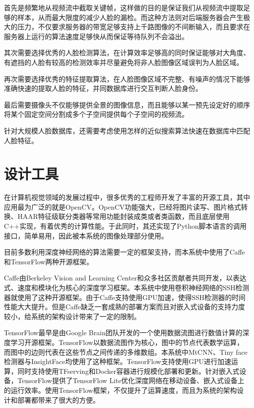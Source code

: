 首先是频繁地从视频流中截取关键帧，这样做的目的是保证我们从视频流中提取足够的样本，从而最大限度的减少人脸的漏检。而这种方法则对后端服务器会产生极大的压力，不仅要求服务器的带宽足够支持上千路图像的不间断输入，而且要求在服务器上运行的算法速度足够快从而保证等待队列不会溢出。

其次需要选择优秀的人脸检测算法，在计算效率足够高的同时保证能够对大角度、有遮挡的人脸有较高的检测效率并尽量避免将非人脸图像区域误判为人脸区域。

再次需要选择优秀的特征提取算法，在人脸图像区域不完整、有噪声的情况下能够准确快速的提取人脸的特征，并同数据库进行交互判断人脸身份。

最后需要摄像头不仅能够提供全景的图像信息，而且能够以某一预先设定好的顺序将某个固定空间分割成多个子空间提供每个子空间的视频流。

针对大规模人脸数据库，还需要考虑使用怎样的近似搜索算法快速在数据库中匹配人脸特征。

\section{设计工具}

在计算机视觉领域的发展过程中，很多优秀的工程师开发了丰富的开源工具，其中应用最为广泛的就是OpenCV\cite{opencv_library}。OpenCV功能强大，已经将图片读写、图片格式转换、HAAR特征级联分类器等常用功能封装成类或者类函数，而且底层使用C++实现，有着优秀的计算性能。于此同时，其还实现了Python脚本语言的调用接口，简单易用，因此被本系统的图像处理部分使用。

目前多数利用深度神经网络的算法需要一定的框架支持，而本系统中使用了Caffe\cite{jia2014caffe}和TensorFlow\cite{tensorflow2015-whitepaper}两种开源框架。

Caffe由Berkeley Vision and Learning Center和众多社区贡献者共同开发，以表达式、速度和模块化为核心的深度学习框架。本系统中使用卷积神经网络的SSH检测器就使用了这种开源框架。由于Caffe支持使用GPU加速，使得SSH检测器的时间性能大大提升。但是Caffe缺乏一套成熟的部署方案而且对嵌入式设备的支持力度较小，给系统的架构设计带来了一定的限制。

TensorFlow最早是由Google Brain团队开发的一个使用数据流图进行数值计算的深度学习开源框架。TensorFlow以数据流图作为核心，图中的节点代表数学运算，而图中的边则代表在这些节点之间传递的多维数组。本系统中MtCNN\cite{zhang2016joint}、Tiny face检测器\cite{hu2017finding}与InsightFace\cite{deng2018arcface}均使用了这种框架。TensorFlow支持使用GPU进行加速运算，同时支持使用TFserving和Docker容器进行规模化部署和更新。针对嵌入式设备，TensorFlow提供了TensorFlow Lite优化深度网络在移动设备、嵌入式设备上的运行效率。使用TensorFlow框架，不仅提升了运算速度，而且为系统的架构设计和部署都带来了很大的方便。

